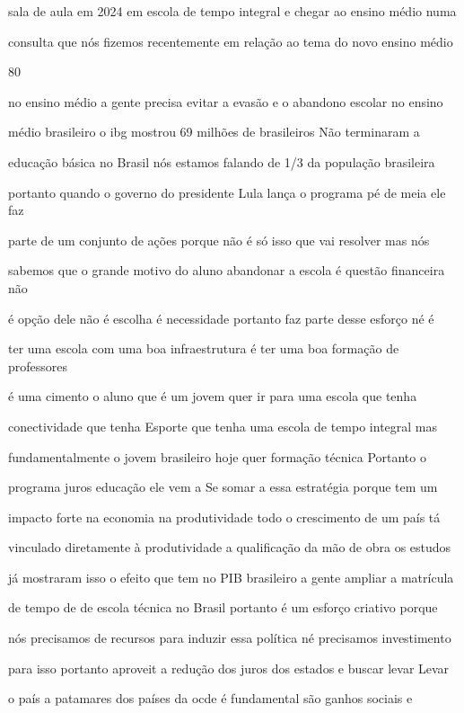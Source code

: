 \documentclass[a4paper,12pt]{article}
\begin{document}
sala de aula em 2024 em escola de tempo integral e chegar ao ensino médio numa

consulta que nós fizemos recentemente em relação ao tema do novo ensino médio

80%

no ensino médio a gente precisa evitar a evasão e o abandono escolar no ensino

médio brasileiro o ibg mostrou 69 milhões de brasileiros Não terminaram a

educação básica no Brasil nós estamos falando de 1/3 da população brasileira

portanto quando o governo do presidente Lula lança o programa pé de meia ele faz

parte de um conjunto de ações porque não é só isso que vai resolver mas nós

sabemos que o grande motivo do aluno abandonar a escola é questão financeira não

é opção dele não é escolha é necessidade portanto faz parte desse esforço né é

ter uma escola com uma boa infraestrutura é ter uma boa formação de professores

é uma cimento o aluno que é um jovem quer ir para uma escola que tenha

conectividade que tenha Esporte que tenha uma escola de tempo integral mas

fundamentalmente o jovem brasileiro hoje quer formação técnica Portanto o

programa juros educação ele vem a Se somar a essa estratégia porque tem um

impacto forte na economia na produtividade todo o crescimento de um país tá

vinculado diretamente à produtividade a qualificação da mão de obra os estudos

já mostraram isso o efeito que tem no PIB brasileiro a gente ampliar a matrícula

de tempo de de escola técnica no Brasil portanto é um esforço criativo porque

nós precisamos de recursos para induzir essa política né precisamos investimento

para isso portanto aproveit a redução dos juros dos estados e buscar levar Levar

o país a patamares dos países da ocde é fundamental são ganhos sociais e
\end{document}
